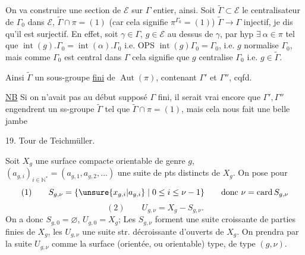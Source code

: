 On va construire une section de $\mathcal E$
sur $\Gamma$  entier, ainsi. Soit $\widetilde\Gamma\subset\mathcal E$
le centralisateur de $\Gamma_0$ dans $\mathcal E$, 
$\widetilde\Gamma\cap\pi=(1)$ (car cela signifie $\pi^{\Gamma_0}=(1)$)
 $\widetilde\Gamma\longrightarrow\Gamma$ injectif, je dis
qu'il est surjectif. En effet, soit
$\gamma\in\Gamma$, $g\in\mathcal E$ au dessus de $\gamma$, par hyp
$\exists\ \alpha\in\pi$ tel que $\operatorname{int}(g).\Gamma_0=\operatorname{int}(\alpha).\Gamma_0$
i.e. OPS $\operatorname{int}(g)\Gamma_0=\Gamma_0$,  i.e. $g$ normalise
$\Gamma_0$, mais comme $\Gamma_0$ est central dans $\Gamma$
cela signifie que $g$ centralise $\Gamma_0$ i.e. $g\in\widetilde\Gamma$.

Ainsi $\widetilde\Gamma$ \inserted{$\simeq\Gamma$}  un sous-groupe \uline{fini} de $\operatorname{Aut}(\pi)$,
 contenant $\Gamma'$ et $\Gamma''$, cqfd.%

\uline{NB} Si on n'avait pas au début supposé
$\Gamma$ fini, il serait vrai encore que $\Gamma',\Gamma''$
engendrent un ss-groupe $\widetilde\Gamma$  tel que
$\widetilde\Gamma\cap\pi=(1)$, mais cela nous fait une
belle jambe 

19. Tour de Teichmüller.

Soit  $X_g$ une surface compacte orientable de
genre $g$, 
\unsure{$[$|$]$} $(a_{g,i})_{i\in\mathbb N^*}=(a_{g,1},a_{g,2},\ldots)$ \unsure{$]$|$[$}
une suite de
pts distincts de $X_g$. On pose pour 
\[
(1)\qquad S_{g,\nu}=\{\unsure{x_{g,i}|a_{g,i}}\mid 0\leq i\leq\nu-1\}
\qquad\text{donc }\nu=\operatorname{card}S_{g,\nu}
\]
\[
(2)\qquad U_{g,\nu}=X_g-S_{g,\nu}.
\]
On a donc $S_{g,0}=\varnothing$, $U_{g,0}=X_g$; Les $S_{g,\nu}$ forment
une suite  croissante de parties finies de $X_g$,
les $U_{g,\nu}$ une suite str. décroissante d'ouverts
de $X_g$. On prendra par la suite $U_{g,\nu}$ comme
la surface (orientée, ou orientable) type, de
type $(g,\nu)$.

